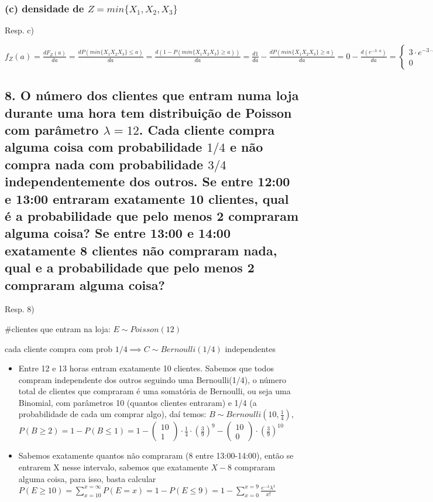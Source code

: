 \documentclass[portuguese]{article}
\begin{document}
\subsubsection*{\textmd{(c) densidade de $Z=min\{X_{1},X_{2},X_{3}\}$}}

Resp. c)

$f_{Z}(a)=\frac{dF_{Z}(a)}{da}=\frac{dP(min\{X_{1}X_{2}X_{3}\}\leq a)}{da}=\frac{d(1-P(min\{X_{1}X_{2}X_{3}\}\geq a))}{da}=\frac{d1}{da}-\frac{dP(min\{X_{1}X_{2}X_{3}\}\geq a)}{da}=0-\frac{d(e^{-3\cdot a})}{da}=\begin{cases}
3\cdot e^{-3\cdot a} & se\, a\geq0\\
0 & caso\, contr\acute{a}rio
\end{cases}$


\subsection*{\textmd{8. O número dos clientes que entram numa loja durante uma
hora tem distribuição de Poisson com parâmetro $\lambda=12$. Cada
cliente compra alguma coisa com probabilidade $1/4$ e não compra
nada com probabilidade $3/4$ independentemente dos outros. Se entre
12:00 e 13:00 entraram exatamente 10 clientes, qual é a probabilidade
que pelo menos 2 compraram alguma coisa? Se entre 13:00 e 14:00 exatamente
8 clientes não compraram nada, qual e a probabilidade que pelo menos
2 compraram alguma coisa?}}

Resp. 8)

\#clientes que entram na loja: $E\sim Poisson(12)$

cada cliente compra com prob $1/4\implies C\sim Bernoulli(1/4)$ independentes
\begin{itemize}
\item Entre 12 e 13 horas entram exatamente 10 clientes. Sabemos que todos
compram independente dos outros seguindo uma Bernoulli(1/4), o número
total de clientes que compraram é uma somatória de Bernoulli, ou seja
uma Binomial, com parâmetros 10 (quantos clientes entraram) e 1/4
(a probabilidade de cada um comprar algo), daí temos: $B\sim Bernoulli(10,\frac{1}{4})$,
$P(B\geq2)=1-P(B\leq1)=1-(\begin{array}{c}
10\\
1
\end{array})\cdot\frac{1}{4}\cdot(\frac{3}{9})^{9}-(\begin{array}{c}
10\\
0
\end{array})\cdot(\frac{3}{9})^{10}$
\item Sabemos exatamente quantos não compraram (8 entre 13:00-14:00), então
se entrarem X nesse intervalo, sabemos que exatamente $X-8$ compraram
alguma coisa, para isso, basta calcular $P(E\geq10)=\sum_{x=10}^{x=\infty}P(E=x)=1-P(E\leq9)=1-\sum_{x=0}^{x=9}\frac{e^{-\lambda}\lambda^{x}}{x!}$
\end{itemize}
\end{document}
